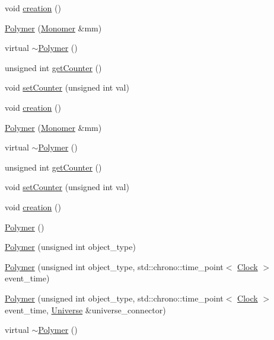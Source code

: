 \begin{DoxyCompactItemize}
\item 
void \mbox{\hyperlink{classPolymer_a1daba3eb2ba8428bf2f3e814668b155f}{creation}} ()
\item 
\mbox{\hyperlink{classPolymer_ae77454a3908652e4df6a26b9cac509a5}{Polymer}} (\mbox{\hyperlink{classMonomer}{Monomer}} \&mm)
\item 
virtual \mbox{\hyperlink{classPolymer_aac2b3983f375a5691c7d5ca1a79594d5}{$\sim$\+Polymer}} ()
\item 
unsigned int \mbox{\hyperlink{classPolymer_a8346d821e5f8690d7816ba1d40036b69}{get\+Counter}} ()
\item 
void \mbox{\hyperlink{classPolymer_a7ed6bbe09a570b59f9253d63fd3326d2}{set\+Counter}} (unsigned int val)
\item 
void \mbox{\hyperlink{classPolymer_a1daba3eb2ba8428bf2f3e814668b155f}{creation}} ()
\item 
\mbox{\hyperlink{classPolymer_ae77454a3908652e4df6a26b9cac509a5}{Polymer}} (\mbox{\hyperlink{classMonomer}{Monomer}} \&mm)
\item 
virtual \mbox{\hyperlink{classPolymer_aac2b3983f375a5691c7d5ca1a79594d5}{$\sim$\+Polymer}} ()
\item 
unsigned int \mbox{\hyperlink{classPolymer_a8346d821e5f8690d7816ba1d40036b69}{get\+Counter}} ()
\item 
void \mbox{\hyperlink{classPolymer_a7ed6bbe09a570b59f9253d63fd3326d2}{set\+Counter}} (unsigned int val)
\item 
void \mbox{\hyperlink{classPolymer_a1daba3eb2ba8428bf2f3e814668b155f}{creation}} ()
\item 
\mbox{\hyperlink{classPolymer_a0f7d915300bfec223c4025f8e9d4f46d}{Polymer}} ()
\item 
\mbox{\hyperlink{classPolymer_adb35b8b7a5eae1e39187c0e525b0d9b1}{Polymer}} (unsigned int object\+\_\+type)
\item 
\mbox{\hyperlink{classPolymer_af918b8776cfd76d9ae4611bf35d4192a}{Polymer}} (unsigned int object\+\_\+type, std\+::chrono\+::time\+\_\+point$<$ \mbox{\hyperlink{universe_8h_a0ef8d951d1ca5ab3cfaf7ab4c7a6fd80}{Clock}} $>$ event\+\_\+time)
\item 
\mbox{\hyperlink{classPolymer_a53797e297c95b3bd934e1b8dd8c0c399}{Polymer}} (unsigned int object\+\_\+type, std\+::chrono\+::time\+\_\+point$<$ \mbox{\hyperlink{universe_8h_a0ef8d951d1ca5ab3cfaf7ab4c7a6fd80}{Clock}} $>$ event\+\_\+time, \mbox{\hyperlink{classUniverse}{Universe}} \&universe\+\_\+connector)
\item 
virtual \mbox{\hyperlink{classPolymer_aac2b3983f375a5691c7d5ca1a79594d5}{$\sim$\+Polymer}} ()

\end{DoxyCompactItemize}
